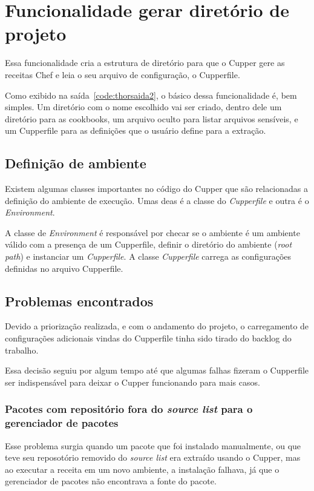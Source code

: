 \section{Funcionalidade gerar diretório de projeto}
\label{sec:proj}

Essa funcionalidade cria a estrutura de diretório para que o Cupper gere as 
receitas Chef e leia o seu arquivo de configuração, o Cupperfile.

Como exibido na saída~\ref{code:thorsaida2}, o básico dessa funcionalidade é, bem
simples. Um diretório com o nome escolhido vai ser criado, dentro dele um diretório
para as cookbooks, um arquivo oculto para listar arquivos sensíveis, e um 
Cupperfile para as definições que o usuário define para a extração.

\subsection{Definição de ambiente}
Existem algumas classes importantes no código do Cupper que são relacionadas a
definição do ambiente de execução. Umas deas é a classe do \textit{Cupperfile} e outra
é o \textit{Environment}.

A classe de \textit{Environment} é responsável por checar se o ambiente é um
ambiente válido com a presença de um Cupperfile, definir o diretório do ambiente
(\textit{root\underline{ }path}) e instanciar um \textit{Cupperfile}. A classe \textit{Cupperfile} carrega as configurações definidas no arquivo Cupperfile.

\subsection{Problemas encontrados}
Devido a priorização realizada, e com o andamento do projeto, o carregamento de
configurações adicionais vindas do Cupperfile tinha sido tirado do backlog do
trabalho.

Essa decisão seguiu por algum tempo até que algumas falhas fizeram o Cupperfile
ser indispensável para deixar o Cupper funcionando para mais casos.

\subsubsection{Pacotes com repositório fora do \textit{source list} para o 
gerenciador de pacotes}
Esse problema surgia quando um pacote que foi instalado manualmente, ou que
teve seu reposotório removido do \textit{source list} era extraído usando o Cupper,
mas ao executar a receita em um novo ambiente, a instalação falhava, já que 
o gerenciador de pacotes não encontrava a fonte do pacote.



